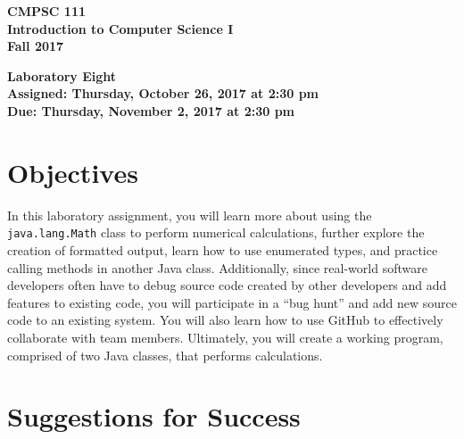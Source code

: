 \documentclass[11pt]{article}
\newcommand{\assignmentduedate}{November 2}
\newcommand{\assignmentassignedate}{October 26}
\newcommand{\assignmentnumber}{Eight}
\newcommand{\labyear}{2017}
\newcommand{\labday}{Thursday}
\newcommand{\labtime}{2:30 pm}
\newcommand{\assigneddate}{Assigned: \labday, \assignmentassignedate, \labyear{} at \labtime{}}
\newcommand{\duedate}{Due: \labday, \assignmentduedate, \labyear{} at \labtime{}}
\newcommand{\labtitle}[1]
{
  \begin{center}
    \begin{center}
      \bf
      CMPSC 111\\Introduction to Computer Science I\\
      Fall 2017\\
      \medskip
    \end{center}
    \bf
    #1
  \end{center}
}
\begin{document}
\thispagestyle{empty}

\labtitle{Laboratory \assignmentnumber{} \\ \assigneddate{} \\ \duedate{}}

\section*{Objectives}

In this laboratory assignment, you will learn more about using the {\tt java.lang.Math} class to perform numerical
calculations, further explore the creation of formatted output, learn how to use enumerated types, and practice calling
methods in another Java class. Additionally, since real-world software developers often have to debug source code
created by other developers and add features to existing code, you will participate in a ``bug hunt'' and add new source
code to an existing system. You will also learn how to use GitHub to effectively collaborate with team members.
Ultimately, you will create a working program, comprised of two Java classes, that performs calculations.

\section*{Suggestions for Success}
\end{document}
